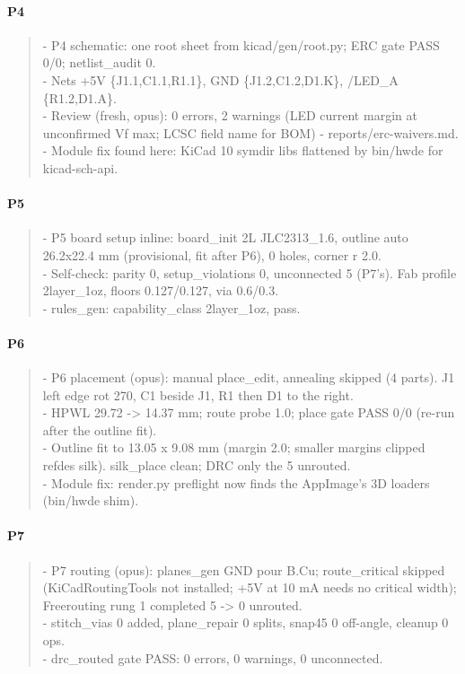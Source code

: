 \documentclass[11pt]{article}
\begin{document}
\paragraph*{P4}
\begin{quote}\small\ttfamily\raggedright
- P4 schematic: one root sheet from kicad/gen/root.py; ERC gate PASS 0/0; netlist\_audit 0.\\
- Nets +5V \{J1.1,C1.1,R1.1\}, GND \{J1.2,C1.2,D1.K\}, /LED\_A \{R1.2,D1.A\}.\\
- Review (fresh, opus): 0 errors, 2 warnings (LED current margin at unconfirmed Vf max; LCSC field name for BOM) - reports/erc-waivers.md.\\
- Module fix found here: KiCad 10 symdir libs flattened by bin/hwde for kicad-sch-api.
\end{quote}
\paragraph*{P5}
\begin{quote}\small\ttfamily\raggedright
- P5 board setup inline: board\_init 2L JLC2313\_1.6, outline auto 26.2x22.4 mm (provisional, fit after P6), 0 holes, corner r 2.0.\\
- Self-check: parity 0, setup\_violations 0, unconnected 5 (P7's). Fab profile 2layer\_1oz, floors 0.127/0.127, via 0.6/0.3.\\
- rules\_gen: capability\_class 2layer\_1oz, pass.
\end{quote}
\paragraph*{P6}
\begin{quote}\small\ttfamily\raggedright
- P6 placement (opus): manual place\_edit, annealing skipped (4 parts). J1 left edge rot 270, C1 beside J1, R1 then D1 to the right.\\
- HPWL 29.72 -\textgreater{} 14.37 mm; route probe 1.0; place gate PASS 0/0 (re-run after the outline fit).\\
- Outline fit to 13.05 x 9.08 mm (margin 2.0; smaller margins clipped refdes silk). silk\_place clean; DRC only the 5 unrouted.\\
- Module fix: render.py preflight now finds the AppImage's 3D loaders (bin/hwde shim).
\end{quote}
\paragraph*{P7}
\begin{quote}\small\ttfamily\raggedright
- P7 routing (opus): planes\_gen GND pour B.Cu; route\_critical skipped (KiCadRoutingTools not installed; +5V at 10 mA needs no critical width); Freerouting rung 1 completed 5 -\textgreater{} 0 unrouted.\\
- stitch\_vias 0 added, plane\_repair 0 splits, snap45 0 off-angle, cleanup 0 ops.\\
- drc\_routed gate PASS: 0 errors, 0 warnings, 0 unconnected.
\end{quote}
\end{document}
